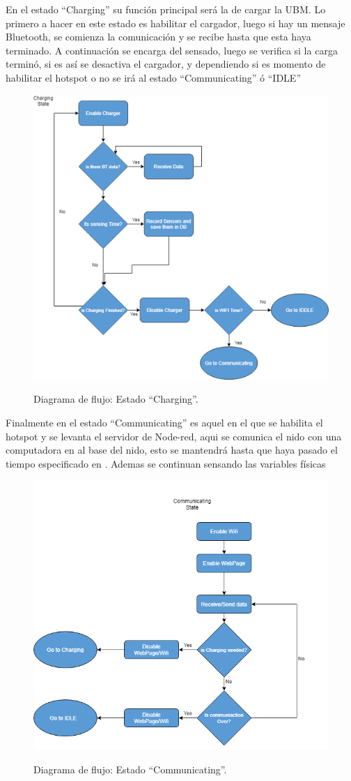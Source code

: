 En el estado ``Charging'' su funci\'on principal ser\'a la de cargar la UBM. Lo primero a hacer en este estado es habilitar el cargador, luego si hay un mensaje Bluetooth, se comienza la comunicaci\'on y se recibe hasta que esta haya terminado. A continuaci\'on se encarga del sensado, luego se verifica si la carga termin\'o, si es as\'i se desactiva el cargador, y dependiendo si es momento de habilitar el hotspot o no se ir\'a al estado ``Communicating'' \'o ``IDLE''
\begin{figure}[H]
	\centering
	\includegraphics[width=0.8\linewidth]{ImagenesIngenieria de Detalle/diagrama_flujo_charging}
	\label{fig:Diagrama_de_flujo_charging}
	\caption{Diagrama de flujo: Estado ``Charging''.}
\end{figure}
Finalmente en el estado ``Communicating'' es aquel en el que se habilita el hotspot y se levanta el servidor de Node-red, aqui se comunica el nido con una computadora en al base del nido, esto se mantendr\'a hasta que haya pasado el tiempo especificado en . Ademas se continuan sensando las variables f\'isicas
\begin{figure}[H]
	\centering
	\includegraphics[width=0.75\linewidth]{ImagenesIngenieria de Detalle/diagrama_flujo_communicating}
	\label{fig:diagrama_flujo_communicating}
	\caption{Diagrama de flujo: Estado ``Communicating''.}
\end{figure}